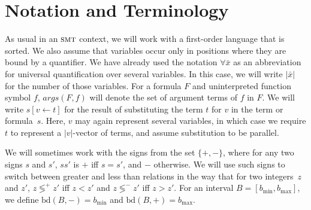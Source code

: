 \documentclass[runningheads]{llncs}
\newcommand{\numvar}[1]{|#1|}
\newcommand{\cmpsignstrict}[1]{\lessgtr^{#1}}
\newcommand{\ivbound}[2]{\text{bd}(#1,#2)}
\newcommand{\smt}{\textsc{smt}}
\newcommand{\req}{\emph{ReqPivot}\xspace}
\newcommand{\subst}[3]{#1[#2\leftarrow #3]}
\begin{document}


\section{Notation and Terminology}

As usual in an $\smt$ context, we will work with a first-order language that is sorted. We also assume that variables occur only in positions where they are bound by a quantifier. We have already used the notation $\forall \bar{x}$ as an abbreviation for universal quantification over several variables. In this case, we will write $\numvar{\bar{x}}$ for the number of those variables. For a formula $F$ and uninterpreted function symbol $f$, $args(F, f)$ will denote the set of argument terms of $f$ in $F$. We will write $\subst{s}{v}{t}$ for the result of substituting the term $t$ for $v$ in the term or formula~$s$. Here, $v$ may again represent several variables, in which case we require $t$ to represent a $\numvar{v}$-vector of terms, and assume substitution to be parallel. 

We will sometimes work with the signs from the set $\{+,-\}$, where
for any two signs $s$ and $s'$, $ss'$ is $+$ iff $s=s'$, and $-$ otherwise. We will use such signs to switch between greater and less than relations in the way that for two integers~$z$ and $z'$, $z\cmpsignstrict{+} z'$ iff $z<z'$ and $z\cmpsignstrict{-} z'$ iff $z>z'$. For an interval $B=[b_{\min}, b_{\max}]$, we define $\ivbound{B}{-}= b_{\min}$ and $\ivbound{B}{+}= b_{\max}$.
\end{document}
